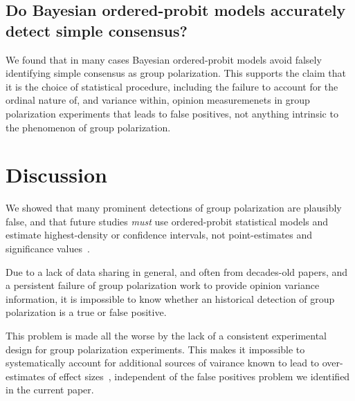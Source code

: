 \documentclass[11pt, letterpaper]{article}
\begin{document}
\hspace{-1em}
\begin{center}

\end{center}
% 

\subsection{Do Bayesian ordered-probit models accurately detect simple consensus?}

We found that in many cases Bayesian ordered-probit models avoid falsely identifying simple
consensus as group polarization. This supports the claim that it is the choice of statistical
procedure, including the failure to account for the ordinal nature of, and variance within,
opinion measuremenets in group polarization experiments that leads to false
positives, not anything intrinsic to the phenomenon of group polarization.


\section{Discussion}

We showed that many prominent detections of group polarization are plausibly
false, and that future studies \emph{must} use ordered-probit statistical
models and estimate highest-density or confidence intervals, not point-estimates 
and significance values~\cite{Meehl1997}.

Due to a lack of data sharing in general, and often from decades-old papers, and a persistent 
failure of group polarization work to provide opinion variance information, 
it is impossible to know whether an historical detection of group polarization
is a true or false positive. 

This problem is made all the worse by the lack of a consistent experimental design for group
polarization experiments. This makes it impossible to systematically account for
additional sources of vairance known to lead to over-estimates
of effect sizes~\cite{Yarkoni2021}, independent of the false positives problem
we identified in the current paper. 

\end{document}
